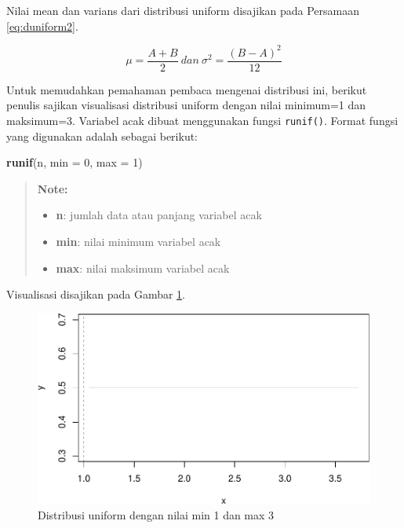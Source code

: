 \documentclass[]{book}
\newenvironment{Shaded}{\begin{snugshade}}{\end{snugshade}}
\newcommand{\KeywordTok}[1]{\textcolor[rgb]{0.13,0.29,0.53}{\textbf{#1}}}
\newcommand{\DataTypeTok}[1]{\textcolor[rgb]{0.13,0.29,0.53}{#1}}
\newcommand{\DecValTok}[1]{\textcolor[rgb]{0.00,0.00,0.81}{#1}}
\newcommand{\NormalTok}[1]{#1}
\providecommand{\tightlist}{%
  \setlength{\itemsep}{0pt}\setlength{\parskip}{0pt}}
\begin{document}
Nilai mean dan varians dari distribusi uniform disajikan pada Persamaan
\eqref{eq:duniform2}.

\begin{equation}
   \mu=\frac{A+B}{2}\ dan\ \sigma^2=\frac{\left(B-A\right)^2}{12}
  \label{eq:duniform2}
\end{equation}

Untuk memudahkan pemahaman pembaca mengenai distribusi ini, berikut
penulis sajikan visualisasi distribusi uniform dengan nilai minimum=1
dan maksimum=3. Variabel acak dibuat menggunakan fungsi
\texttt{runif()}. Format fungsi yang digunakan adalah sebagai berikut:

\begin{Shaded}
\begin{Highlighting}[]
\KeywordTok{runif}\NormalTok{(n, }\DataTypeTok{min =} \DecValTok{0}\NormalTok{, }\DataTypeTok{max =} \DecValTok{1}\NormalTok{)}
\end{Highlighting}
\end{Shaded}

\begin{quote}
\textbf{Note: }

\begin{itemize}
\tightlist
\item
  \textbf{n}: jumlah data atau panjang variabel acak
\item
  \textbf{min}: nilai minimum variabel acak
\item
  \textbf{max}: nilai maksimum variabel acak
\end{itemize}
\end{quote}

Visualisasi disajikan pada Gambar \ref{fig:uniformvis}.

\begin{figure}

{\centering \includegraphics[width=0.7\linewidth]{EnvStat_files/figure-latex/uniformvis-1} 

}

\caption{Distribusi uniform dengan nilai min 1 dan max 3}\label{fig:uniformvis}
\end{figure}
\end{document}
